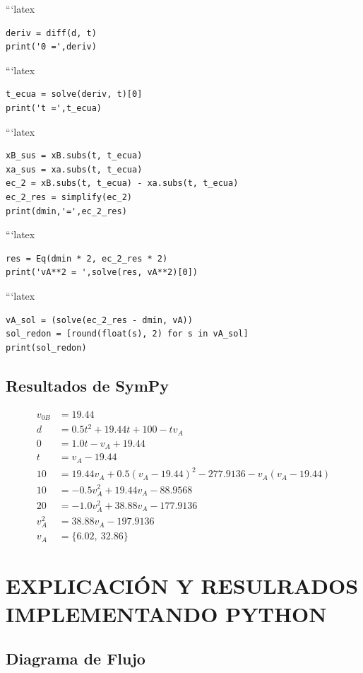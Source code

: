 \documentclass[12pt,a4paper]{article}
\begin{document}
```latex
\begin{lstlisting}
deriv = diff(d, t)
print('0 =',deriv)
\end{lstlisting}

```latex
\begin{lstlisting}
t_ecua = solve(deriv, t)[0]
print('t =',t_ecua)
\end{lstlisting}

```latex
\begin{lstlisting}
xB_sus = xB.subs(t, t_ecua)
xa_sus = xa.subs(t, t_ecua)
ec_2 = xB.subs(t, t_ecua) - xa.subs(t, t_ecua)
ec_2_res = simplify(ec_2)
print(dmin,'=',ec_2_res)
\end{lstlisting}

```latex
\begin{lstlisting}
res = Eq(dmin * 2, ec_2_res * 2)
print('vA**2 = ',solve(res, vA**2)[0])
\end{lstlisting}

```latex
\begin{lstlisting}
vA_sol = (solve(ec_2_res - dmin, vA))
sol_redon = [round(float(s), 2) for s in vA_sol]
print(sol_redon)
\end{lstlisting}

\subsection{Resultados de SymPy}


\[
\begin{aligned}
v_{0B} &= 19.44 \\
d &= 0.5t^{2} + 19.44t + 100 - t v_{A} \\
0 &= 1.0t - v_{A} + 19.44 \\
t &= v_{A} - 19.44 \\
10 &= 19.44v_{A} + 0.5(v_{A} - 19.44)^{2} - 277.9136 - v_{A}(v_{A} - 19.44) \\
10 &= -0.5v_{A}^{2} + 19.44v_{A} - 88.9568 \\
20 &= -1.0v_{A}^{2} + 38.88v_{A} - 177.9136 \\
v_{A}^{2} &= 38.88v_{A} - 197.9136 \\
v_{A} &= \{6.02,\ 32.86\}
\end{aligned}
\]


\section{EXPLICACIÓN Y RESULRADOS IMPLEMENTANDO PYTHON}

\subsection{Diagrama de Flujo}
\end{document}
